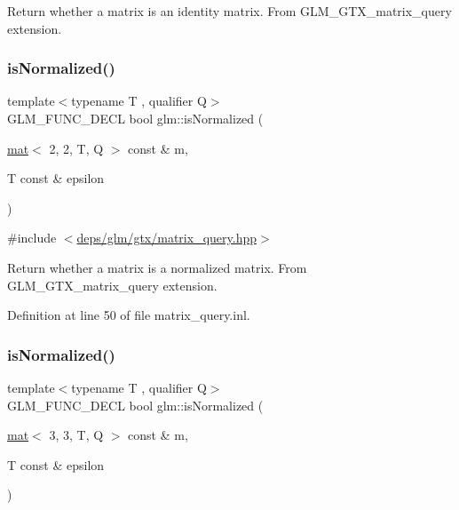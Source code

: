 Return whether a matrix is an identity matrix. From G\+L\+M\+\_\+\+G\+T\+X\+\_\+matrix\+\_\+query extension. \mbox{\label{group__gtx__matrix__query_gae785af56f47ce220a1609f7f84aa077a}} 
\subsubsection{\texorpdfstring{is\+Normalized()}{isNormalized()}\hspace{0.1cm}{\footnotesize\ttfamily [1/3]}}
{\footnotesize\ttfamily template$<$typename T , qualifier Q$>$ \\
G\+L\+M\+\_\+\+F\+U\+N\+C\+\_\+\+D\+E\+CL bool glm\+::is\+Normalized (\begin{DoxyParamCaption}\item[{\hyperlink{structglm_1_1mat}{mat}$<$ 2, 2, T, Q $>$ const \&}]{m,  }\item[{T const \&}]{epsilon }\end{DoxyParamCaption})}



{\ttfamily \#include $<$\hyperlink{matrix__query_8hpp}{deps/glm/gtx/matrix\+\_\+query.\+hpp}$>$}

Return whether a matrix is a normalized matrix. From G\+L\+M\+\_\+\+G\+T\+X\+\_\+matrix\+\_\+query extension. 

Definition at line 50 of file matrix\+\_\+query.\+inl.

\mbox{\label{group__gtx__matrix__query_gaa068311695f28f5f555f5f746a6a66fb}} 
\subsubsection{\texorpdfstring{is\+Normalized()}{isNormalized()}\hspace{0.1cm}{\footnotesize\ttfamily [2/3]}}
{\footnotesize\ttfamily template$<$typename T , qualifier Q$>$ \\
G\+L\+M\+\_\+\+F\+U\+N\+C\+\_\+\+D\+E\+CL bool glm\+::is\+Normalized (\begin{DoxyParamCaption}\item[{\hyperlink{structglm_1_1mat}{mat}$<$ 3, 3, T, Q $>$ const \&}]{m,  }\item[{T const \&}]{epsilon }\end{DoxyParamCaption})}



